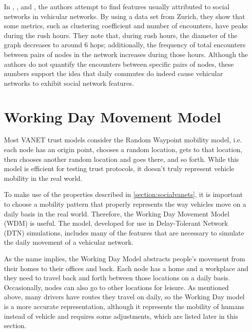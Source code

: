 In \cite{da2013effective}, \cite{cunha2014vehicular}, and \cite{cunha2014possible}, the authors attempt to find features usually attributed to social networks in vehicular networks.
By using a data set from Zurich, they show that some metrics, such as clustering coefficient and number of encounters, have peaks during the rush hours.
They note that, during rush hours, the diameter of the graph decreases to around 6 hops; additionally, the frequency of total encounters between pairs of nodes in the network increases during those hours.
Although the authors do not quantify the encounters between specific pairs of nodes, these numbers support the idea that daily commutes do indeed cause vehicular networks to exhibit social network features.


\section{Working Day Movement Model}
\label{section:workingday}

Most VANET trust models consider the Random Waypoint mobility model, i.e. each node has an origin point, chooses a random location, gets to that location, then chooses another random location and goes there, and so forth.
While this model is efficient for testing trust protocols, it doesn't truly represent vehicle mobility in the real world.

To make use of the properties described in \autoref{section:socialvanets}, it is important to choose a mobility pattern that properly represents the way vehicles move on a daily basis in the real world.
Therefore, the Working Day Movement Model \cite{ekman2008working} (WDM) is useful.
The model, developed for use in Delay-Tolerant Network (DTN) simulations, includes many of the features that are necessary to simulate the daily movement of a vehicular network.

As the name implies, the Working Day Model abstracts people's movement from their homes to their offices and back.
Each node has a home and a workplace and they need to travel back and forth between those locations on a daily basis.
Occasionally, nodes can also go to other locations for leisure.
As mentioned above, many drivers have routes they travel on daily, so the Working Day model is a more accurate representation, although it represents the mobility of humans instead of vehicle and requires some adjustments, which are listed later in this section.

